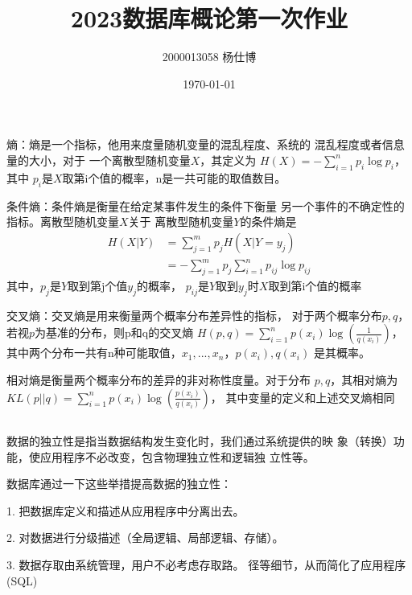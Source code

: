 \documentclass[UTF8]{ctexart}
\title{\vspace{-4cm}2023数据库概论第一次作业}
\author{2000013058 杨仕博}
\date{\today}
\begin{document}
\maketitle

\subsection{}

熵：熵是一个指标，他用来度量随机变量的混乱程度、系统的
混乱程度或者信息量的大小，对于
一个离散型随机变量$X$，其定义为
$H(X) = -\sum_{i=1}^{n}p_i\log p_i$，其中
$p_i$是$X$取第i个值的概率，n是一共可能的取值数目。

条件熵：条件熵是衡量在给定某事件发生的条件下衡量
另一个事件的不确定性的指标。离散型随机变量$X$关于
离散型随机变量$Y$的条件熵是
\[
\begin{aligned}
    H(X | Y) &= \sum\limits_{j = 1}^m p_j H(X | Y = y_j)\\
             &= -\sum\limits_{j = 1}^m p_j \sum\limits_{i = 1}^n p_{ij}\log p_{ij}
\end{aligned}
\]
其中，$p_j$是$Y$取到第j个值$y_j$的概率，
$p_{ij}$是$Y$取到$y_j$时$X$取到第i个值的概率

交叉熵：交叉熵是用来衡量两个概率分布差异性的指标，
对于两个概率分布$p, q$，若视$p$为基准的分布，则p和q的交叉熵
$H(p, q) = \sum\limits_{i = 1}^np(x_i)\log(\frac{1}{q(x_i)})$，
其中两个分布一共有n种可能取值，$x_1, ..., x_n$，$p(x_i), q(x_i)$
是其概率。

相对熵是衡量两个概率分布的差异的非对称性度量。对于分布
$p, q$，其相对熵为
$KL(p || q) = \sum\limits_{i = 1}^np(x_i)\log(\frac{p(x_i)}{q(x_i)})$，
其中变量的定义和上述交叉熵相同

\subsection{}

数据的独立性是指当数据结构发生变化时，我们通过系统提供的映
象（转换）功能，使应用程序不必改变，包含物理独立性和逻辑独
立性等。

数据库通过一下这些举措提高数据的独立性：

1. 把数据库定义和描述从应用程序中分离出去。

2. 对数据进行分级描述（全局逻辑、局部逻辑、存储）。

3. 数据存取由系统管理，用户不必考虑存取路。
径等细节，从而简化了应用程序(SQL)

\subsection{}
\end{document}
